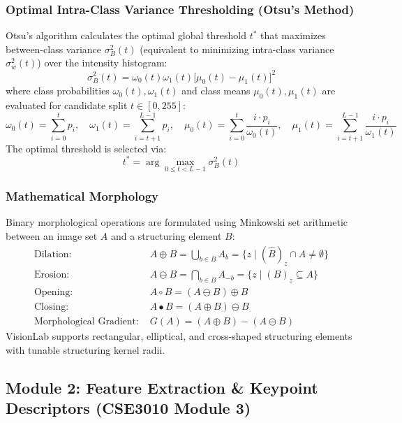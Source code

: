 \subsubsection{Optimal Intra-Class Variance Thresholding (Otsu's Method)}
Otsu's algorithm calculates the optimal global threshold $t^*$ that maximizes between-class variance $\sigma_B^2(t)$ (equivalent to minimizing intra-class variance $\sigma_w^2(t)$) over the intensity histogram:
\begin{equation}
    \sigma_B^2(t) = \omega_0(t) \omega_1(t) \Big[ \mu_0(t) - \mu_1(t) \Big]^2
\end{equation}
where class probabilities $\omega_0(t), \omega_1(t)$ and class means $\mu_0(t), \mu_1(t)$ are evaluated for candidate split $t \in [0, 255]$:
\begin{equation}
    \omega_0(t) = \sum_{i=0}^t p_i, \quad \omega_1(t) = \sum_{i=t+1}^{L-1} p_i, \quad \mu_0(t) = \sum_{i=0}^t \frac{i \cdot p_i}{\omega_0(t)}, \quad \mu_1(t) = \sum_{i=t+1}^{L-1} \frac{i \cdot p_i}{\omega_1(t)}
\end{equation}
The optimal threshold is selected via:
\begin{equation}
    t^* = \arg\max_{0 \le t < L-1} \sigma_B^2(t)
\end{equation}

\subsubsection{Mathematical Morphology}
Binary morphological operations are formulated using Minkowski set arithmetic between an image set $A$ and a structuring element $B$:
\begin{align}
    \text{Dilation: } & A \oplus B = \bigcup_{b \in B} A_b = \Big\{ z \;\Big|\; (\hat{B})_z \cap A \neq \emptyset \Big\} \\
    \text{Erosion: } & A \ominus B = \bigcap_{b \in B} A_{-b} = \Big\{ z \;\Big|\; (B)_z \subseteq A \Big\} \\
    \text{Opening: } & A \circ B = (A \ominus B) \oplus B \\
    \text{Closing: } & A \bullet B = (A \oplus B) \ominus B \\
    \text{Morphological Gradient: } & G(A) = (A \oplus B) - (A \ominus B)
\end{align}
VisionLab supports rectangular, elliptical, and cross-shaped structuring elements with tunable structuring kernel radii.

\subsection{Module 2: Feature Extraction \& Keypoint Descriptors (CSE3010 Module 3)}

